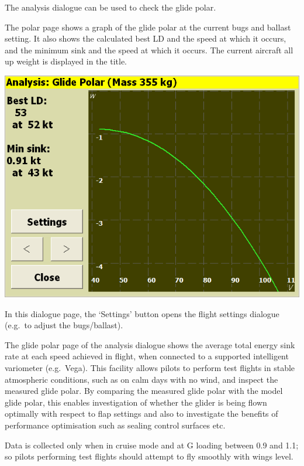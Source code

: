 The analysis dialogue can be used to check the glide polar.  

The polar page shows a graph of the glide polar at the current bugs
and ballast setting.  It also shows the calculated best LD and the
speed at which it occurs, and the minimum sink and the speed at which
it occurs.  The current aircraft all up weight is displayed in the
title.

\begin{center}
\includegraphics[angle=0,width=0.8\linewidth,keepaspectratio='true']{figures/analysis-glidepolar.png}
\end{center}

In this dialogue page, the `Settings' button opens the flight settings
dialogue (e.g.\ to adjust the bugs/ballast).

The glide polar page of the analysis dialogue shows the average total
energy sink rate at each speed achieved in flight, when connected to a
supported intelligent variometer (e.g.\ Vega).  This facility allows
pilots to perform test flights in stable atmospheric conditions, such
as on calm days with no wind, and inspect the measured glide polar.
By comparing the measured glide polar with the model glide polar, this
enables investigation of whether the glider is being flown optimally
with respect to flap settings and also to investigate the benefits of
performance optimisation such as sealing control surfaces etc.

Data is collected only when in cruise mode and at G loading between
0.9 and 1.1; so pilots performing test flights should attempt to fly
smoothly with wings level.

